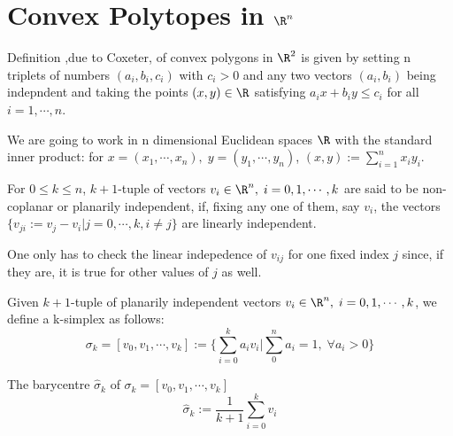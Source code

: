 \documentclass{article}
\begin{document}
\section{Convex Polytopes in $\R^n$}
\label{sec-2}
Definition ,due to Coxeter, of convex polygons in $\R^2$ is given by setting n triplets of numbers $(a_i,b_i,c_i)$ with $c_i>0$ and any two vectors $(a_i,b_i)$ being indepndent and taking the points $(x,y) \in \R$ satisfying $a_ix +b_i y\le c_i$ for all $i=1,\cdots,n$.
\par
We are going to work in n dimensional Euclidean spaces $\R$ with the standard inner product: for $x=(x_1,\cdots, x_n), \; y=(y_1,\cdots,y_n)$, $(x,y) :=\sum_{i=1}^{n} x_i y_i$.
\begin{Def}
 For $0\le k \le n$, $k+1$-tuple of vectors $v_i \in \R^n, \; i=0,1,\cdots,k$ are said to be non-coplanar or planarily independent, if, fixing any one of them, say $v_i$, the vectors $\{v_{ji}:=v_j -v_i|j=0,\cdots,k,i\ne j\}$ are linearly independent.
\end{Def}
One only has to check the linear indepedence of $v_{ij}$ for one fixed index $j$ since, if they are, it is true for other values of $j$ as well.
\begin{Def}
Given $k+1$-tuple of planarily independent vectors $v_i \in \R^n, \; i=0,1,\cdots,k$, we define a k-simplex as follows:
\begin{equation}
\label{}
\sigma_k = [v_0,v_1,\cdots,v_k] := \Big\{ \sum_{i=0}^{k} a_i v_i | \sum_{0}^{n} a_i = 1, \; \forall a_i >0  \Big\}
\end{equation}
\end{Def}
\begin{Def}
The barycentre $\hat{\sigma}_k$ of $\sigma_k = [v_0,v_1,\cdots,v_k] $
\begin{equation}
\label{}
\hat{\sigma}_k := \frac{1}{k+1} \sum_{i=0}^{k} v_i 
\end{equation}
\end{Def}
\end{document}
